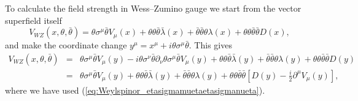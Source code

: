 \documentclass[notes.tex]{subfiles}
\begin{document}
\begin{Answer}
To calculate the field strength in Wess--Zumino gauge we start from the vector superfield itself
\begin{equation}
V_{WZ} (x, \theta, \bar{\theta}) = \theta\sigma^\mu \bar{\theta}V_\mu(x) + \theta\theta\bar{\theta}\bar{\lambda}(x) + \bar{\theta}\bar{\theta}\theta\lambda (x) + \theta\theta\bar{\theta}\bar{\theta}D(x),
\end{equation}
and make the coordinate change $y^\mu=x^\mu + i\theta\sigma^\mu\bar\theta$. This gives
\begin{eqnarray}
V_{WZ} (x, \theta, \bar{\theta}) &=& \theta\sigma^\mu \bar{\theta}V_\mu(y)- i\theta\sigma^\nu\bar\theta\partial_\nu \theta\sigma^\mu \bar{\theta} V_\mu(y)  + \theta\theta\bar{\theta}\bar{\lambda}(y) + \bar{\theta}\bar{\theta}\theta\lambda (y) + \theta\theta\bar{\theta}\bar{\theta}D(y) \nonumber\\
&=& \theta\sigma^\mu \bar{\theta}V_\mu(y) + \theta\theta\bar{\theta}\bar{\lambda}(y) + \bar{\theta}\bar{\theta}\theta\lambda (y) + \theta\theta\bar\theta\bar\theta[D(y)- \frac{i}{2}\partial^\mu V_\mu(y)],
\end{eqnarray}
where we have used (\ref{eq:Weylspinor_etasigmamuetaetasigmanueta}).


\end{Answer}
\end{document}

